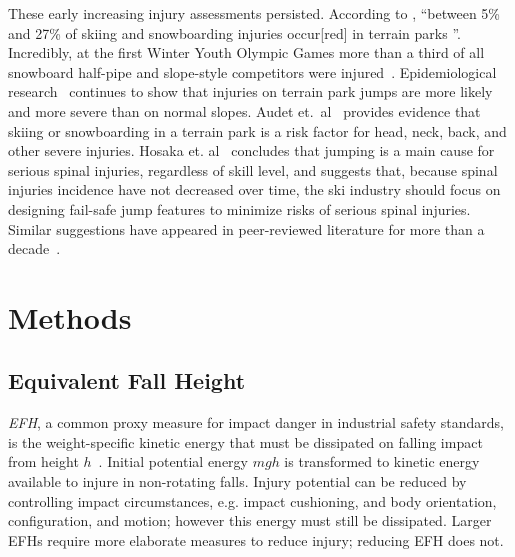 \documentclass[smallextended]{svjour3}       %
\begin{document}
These early increasing injury assessments persisted. According to
\cite{Russell2014}, ``between 5\% and 27\% of skiing and snowboarding injuries
occur[red] in terrain parks
\cite{Bridges2003,Goulet2007,Moffat2009,Greve2009,Brooks2010,Ruedl2013}''.
Incredibly, at the first Winter Youth Olympic Games more than a third of all
snowboard half-pipe and slope-style competitors were injured~\cite{Ruedl2012}.
Epidemiological research~\cite{Carus2016,Audet2020,Hosaka2020} continues to
show that injuries on terrain park jumps are more likely and more severe than
on normal slopes. Audet et.~al~\cite{Audet2020} provides evidence that skiing
or snowboarding in a terrain park is a risk factor for head, neck, back, and
other severe injuries. Hosaka et. al~\cite{Hosaka2020} concludes that jumping
is a main cause for serious spinal injuries, regardless of skill level, and
suggests that, because spinal injuries incidence  have not decreased over time,
the ski industry should focus on designing fail-safe jump features to minimize
risks of serious spinal injuries. Similar suggestions have appeared in
peer-reviewed literature for more than a
decade~\cite{Hubbard2009,Swedberg2012,Hubbard2012,McNeil2012,McNeil2012a,Hubbard2015,Levy2015,Petrone2017,Moore2018}.

\section{Methods}
\subsection{Equivalent Fall Height}
\label{sec:efh}
%
\emph{EFH}, a common proxy measure for impact danger in industrial safety
standards, is the weight-specific kinetic energy that must be dissipated on
falling impact from height $h$~\cite{Muller1995,Hubbard2009,Gasser2018}.
Initial potential energy $mgh$ is transformed to kinetic energy available to
injure in non-rotating falls. Injury potential can be reduced by controlling
impact circumstances, e.g. impact cushioning, and body orientation,
configuration, and motion; however this energy must still be dissipated. Larger
EFHs require more elaborate measures to reduce injury; reducing EFH does not.
\end{document}

